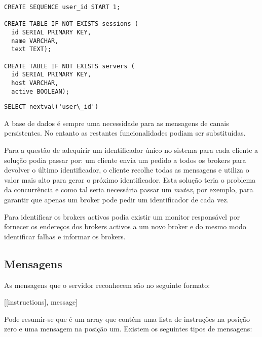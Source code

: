\renewcommand*{\lstlistingname}{SQL}
\begin{lstlisting}
CREATE SEQUENCE user_id START 1;

CREATE TABLE IF NOT EXISTS sessions (
  id SERIAL PRIMARY KEY,
  name VARCHAR,
  text TEXT);

CREATE TABLE IF NOT EXISTS servers (
  id SERIAL PRIMARY KEY,
  host VARCHAR,
  active BOOLEAN);
\end{lstlisting}

\begin{lstlisting}
SELECT nextval('user\_id')
\end{lstlisting}


A base de dados é sempre uma necessidade para as mensagens de canais persistentes.
No entanto as restantes funcionalidades podiam ser substituídas.

Para a questão de adequirir um identificador único no sistema para cada cliente a solução podia passar por:
um cliente envia um pedido a todos os brokers para devolver o último identificador, o cliente recolhe todas as mensagens e utiliza o valor mais alto para gerar o próximo identificador. Esta solução teria o problema da concurrência e como tal seria necessária passar um \textit{mutex}, por exemplo, para garantir que apenas um broker pode pedir um identificador de cada vez.

Para identificar os brokers activos podia existir um monitor responsável por fornecer os endereços dos brokers activos a um novo broker e do mesmo modo identificar falhas e informar os brokers.

\subsection{Mensagens}

As mensagens que o servidor reconhecem são no seguinte formato:

[[instructions], message]

Pode resumir-se que é um array que contém uma lista de instruções na posição zero e uma mensagem na posição um. Existem os seguintes tipos de mensagens:

